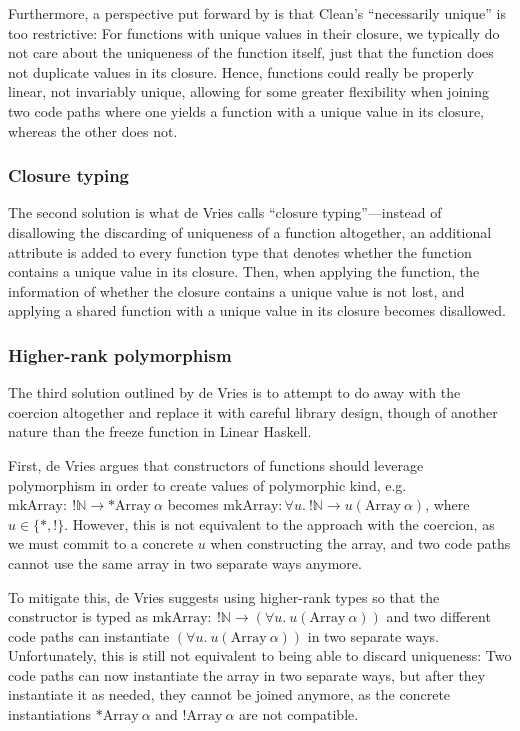 Furthermore, a perspective put forward by \cite{sergey_linearity_2022} is that Clean's ``necessarily unique'' is too restrictive: For functions with unique values in their closure, we typically do not care about the uniqueness of the function itself, just that the function does not duplicate values in its closure. Hence, functions could really be properly linear, not invariably unique, allowing for some greater flexibility when joining two code paths where one yields a function with a unique value in its closure, whereas the other does not.

\subsubsection{Closure typing}
The second solution is what de Vries calls ``closure typing''---instead of disallowing the discarding of uniqueness of a function altogether, an additional attribute is added to every function type that denotes whether the function contains a unique value in its closure. Then, when applying the function, the information of whether the closure contains a unique value is not lost, and applying a shared function with a unique value in its closure becomes disallowed.

\subsubsection{Higher-rank polymorphism}
The third solution outlined by de Vries is to attempt to do away with the coercion altogether and replace it with careful library design, though of another nature than the freeze function in Linear Haskell. 

First, de Vries argues that constructors of functions should leverage polymorphism in order to create values of polymorphic kind, e.g.\ $\mathrm{mkArray} :\ !\mathbb{N} \to *\mathrm{Array}\ \alpha$ becomes $\mathrm{mkArray} : \forall u.\ !\mathbb{N} \to u(\mathrm{Array}\ \alpha)$, where $u \in \{*, !\}$. However, this is not equivalent to the approach with the coercion, as we must commit to a concrete $u$ when constructing the array, and two code paths cannot use the same array in two separate ways anymore. 

To mitigate this, de Vries suggests using higher-rank types so that the constructor is typed as $\mathrm{mkArray} : \ !\mathbb{N} \to (\forall u.\ u(\mathrm{Array}\ \alpha))$ and two different code paths can instantiate $(\forall u.\ u(\mathrm{Array}\ \alpha))$ in two separate ways. Unfortunately, this is still not equivalent to being able to discard uniqueness: Two code paths can now instantiate the array in two separate ways, but after they instantiate it as needed, they cannot be joined anymore, as the concrete instantiations $*\mathrm{Array}\ \alpha$ and $!\mathrm{Array}\ \alpha$ are not compatible.

